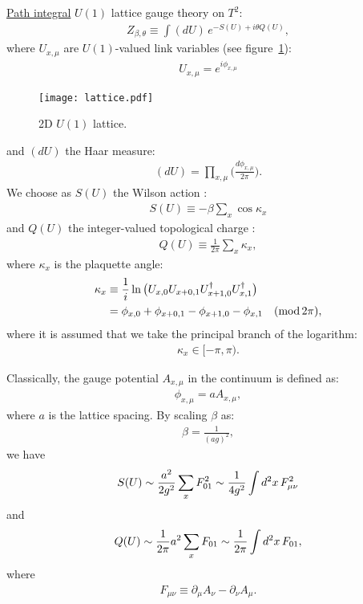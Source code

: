 \documentclass[12pt]{article}
\begin{document}
\noindent \underline{Path integral}\newline
$U(1)$ lattice gauge theory on $T^2$:
\begin{align}
  Z_{\beta,\theta} \equiv \int(dU)\, e^{-S(U) + i \theta Q(U)},
\end{align}
where $U_{x,\mu}$ are $U(1)$-valued link variables
(see figure~\ref{fig:lat}):
\begin{align}
  U_{x,\mu} = e^{i\phi_{x,\mu}}
\end{align}
\begin{figure}[htb]
  \centering
  \texttt{[image: lattice.pdf]}
  \caption{2D $U(1)$ lattice.}
  \label{fig:lat}
\end{figure}
and $(dU)$ the Haar measure:
\begin{align}
  (dU) = \prod_{x,\mu} \Big( \frac{d\phi_{x,\mu}}{2\pi} \Big).
\end{align}
We choose as $S(U)$ the Wilson action \cite{Wilson:1974sk}:
\begin{align}
  S(U) \equiv
  -\beta \sum_x \cos \kappa_x
\end{align}
and $Q(U)$ the integer-valued topological charge \cite{Luscher:1981zq,Phillips:1985sgx}:
\begin{align}
  Q(U) \equiv \frac{1}{2\pi} \sum_x \kappa_x,
\end{align}
where $\kappa_x$ is the plaquette angle:
\begin{align}
  \kappa_x
  &\equiv {1\over i}\ln\big(
  U_{x,0} U_{x+0,1} U_{x+1,0}^\dagger U_{x,1}^\dagger
  \big)\nonumber\\
  &= \phi_{x,0} + \phi_{x+0,1} -\phi_{x+1,0} - \phi_{x,1} \quad ({\rm mod} \, 2\pi),
\end{align}
where it is assumed that we take the principal branch of the logarithm:
\begin{align}
  \kappa_x \in [-\pi,\pi).
\end{align}

Classically,
the gauge potential $A_{x,\mu}$ in the continuum is defined as:
\begin{align}
  \phi_{x,\mu} = a A_{x,\mu},
\end{align}
where $a$ is the lattice spacing.
By scaling $\beta$ as:
\begin{align}
  \beta = \frac{1}{(ag)^2},
\end{align}
we have
\begin{align}
  S(U) \sim {a^2 \over 2g^2 }\sum_x F_{01}^2 \sim {1\over 4g^2} \int d^2x \,  F_{\mu\nu}^2
\end{align}
and
\begin{align}
  Q(U) \sim {1\over 2\pi} a^2 \sum_x F_{01} \sim {1\over 2\pi} \int d^2x \, F_{01},
\end{align}
where
\begin{align}
  F_{\mu\nu} \equiv \partial_\mu A_\nu - \partial_\nu A_\mu.
\end{align}
\end{document}
